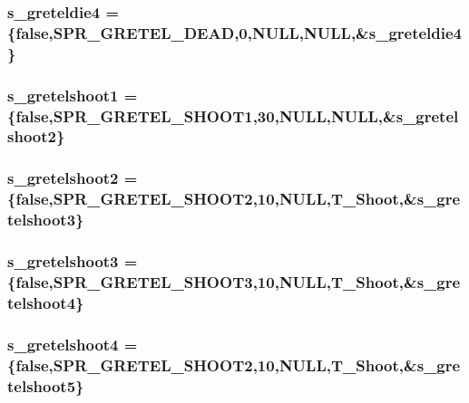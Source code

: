 \label{WL__ACT2_8C_acd062dec778f9e003bd1922935d3e802}
\hypertarget{WL__ACT2_8C_a95821a58802556e05bfe6530c5eead56}{
\subsubsection[{s\_\-greteldie4}]{ {\bf s\_\-greteldie4} = \{false,SPR\_\-GRETEL\_\-DEAD,0,NULL,NULL,\&{\bf s\_\-greteldie4}\}}}
\label{WL__ACT2_8C_a95821a58802556e05bfe6530c5eead56}
\hypertarget{WL__ACT2_8C_a73a1c53d4b9962b650a781bbedaaf302}{
\subsubsection[{s\_\-gretelshoot1}]{ {\bf s\_\-gretelshoot1} = \{false,SPR\_\-GRETEL\_\-SHOOT1,30,NULL,NULL,\&{\bf s\_\-gretelshoot2}\}}}
\label{WL__ACT2_8C_a73a1c53d4b9962b650a781bbedaaf302}
\hypertarget{WL__ACT2_8C_a68ef551d215ee44de5e466fa62a20cfa}{
\subsubsection[{s\_\-gretelshoot2}]{ {\bf s\_\-gretelshoot2} = \{false,SPR\_\-GRETEL\_\-SHOOT2,10,NULL,T\_\-Shoot,\&{\bf s\_\-gretelshoot3}\}}}
\label{WL__ACT2_8C_a68ef551d215ee44de5e466fa62a20cfa}
\hypertarget{WL__ACT2_8C_a7674dcf09ae440f7a060ba04c3e79165}{
\subsubsection[{s\_\-gretelshoot3}]{ {\bf s\_\-gretelshoot3} = \{false,SPR\_\-GRETEL\_\-SHOOT3,10,NULL,T\_\-Shoot,\&{\bf s\_\-gretelshoot4}\}}}
\label{WL__ACT2_8C_a7674dcf09ae440f7a060ba04c3e79165}
\hypertarget{WL__ACT2_8C_aee62a066bdc868cc8dd092d4478aa228}{
\subsubsection[{s\_\-gretelshoot4}]{ {\bf s\_\-gretelshoot4} = \{false,SPR\_\-GRETEL\_\-SHOOT2,10,NULL,T\_\-Shoot,\&{\bf s\_\-gretelshoot5}\}}}
